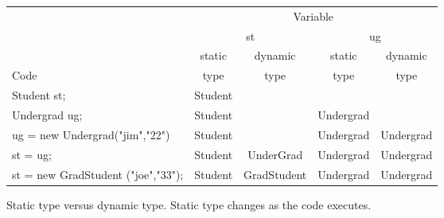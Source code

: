 






\begin {figure}

\begin {tabular} {l | c |c|c|c}
	& \multicolumn{4}{c}{Variable}		\\
\cline{2-5}
	& \multicolumn{2}{c|}{st}	&  \multicolumn{2}{c}{ug}	\\ 
	\cline{2-5}	
				& static 	& dynamic	& static	& dynamic	\\
Code				&  type		&  type		& type 	 	&  type		\\
\hline
Student st;			& Student	& 		&		&		\\
Undergrad ug;			& Student   	& 		& Undergrad	&		\\
ug = new Undergrad("jim","22") 	& Student	& 		& Undergrad	& Undergrad	\\
st = ug; 		 	& Student	& UnderGrad	& Undergrad	& Undergrad	\\
st = new GradStudent ("joe","33");& Student	& GradStudent	& Undergrad	& Undergrad	\\

\end {tabular}

\caption {Static type versus dynamic type. Static type changes as the
code executes.}


\label {fig:staticDynamicType}

\end {figure}


